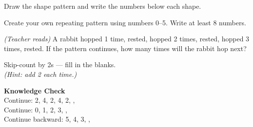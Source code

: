 \documentclass[12pt,letterpaper]{article}
\begin{document}
\vspace{10pt}
\prob Draw the shape pattern and write the numbers below each shape.\\[6pt]
\begin{center}
\end{center}

\vspace{10pt}
\prob Create your own repeating pattern using numbers 0–5.
Write at least 8 numbers.\\[8pt]
\noindent\fbox{\rule{0pt}{1.4cm}\hspace{12cm}}

\vspace{10pt}
\prob \textit{(Teacher reads)} A rabbit hopped 1 time, rested,
hopped 2 times, rested, hopped 3 times, rested.
If the pattern continues, how many times will the rabbit hop next? \quad\ansblank

\vspace{10pt}
\prob Skip-count by 2s — fill in the blanks.\\[6pt]
\hspace{1cm}{\Large 0, 2, \ansblank, \ansblank, \ansblank}
\textit{(Hint: add 2 each time.)}

\goldrule

\begin{checkbox}
\noindent\textbf{\color{sd-green}Knowledge Check}\\[4pt]
\setcounter{probnum}{0}
\prob Continue: 2, 4, 2, 4, 2, \ansblank, \ansblank\\[8pt]
\prob Continue: 0, 1, 2, 3, \ansblank, \ansblank\\[8pt]
\prob Continue backward: 5, 4, 3, \ansblank, \ansblank
\end{checkbox}
\end{document}
